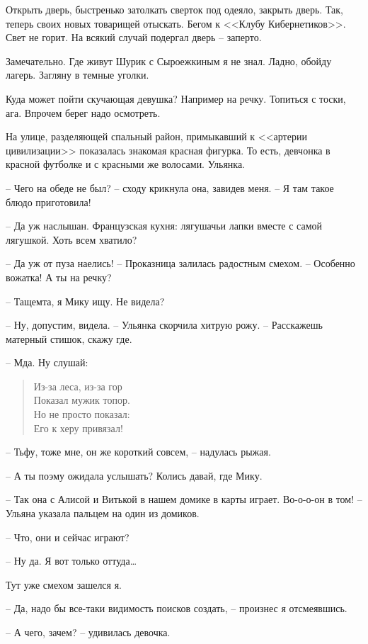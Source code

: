 \documentclass[a4paper]{book}
\begin{document}
Открыть дверь, быстренько затолкать сверток под одеяло, закрыть дверь. Так, теперь своих новых товарищей отыскать. Бегом к <<Клубу Кибернетиков>>. Свет не горит. На всякий случай подергал дверь -- заперто. 

Замечательно. Где живут Шурик с Сыроежкиным я не знал. Ладно, обойду лагерь. Загляну в темные уголки. 

Куда может пойти скучающая девушка? Например на речку. Топиться с тоски, ага. Впрочем берег надо осмотреть.

На улице, разделяющей спальный район, примыкавший к <<артерии цивилизации>> показалась знакомая красная фигурка. То есть, девчонка в красной футболке и с красными же волосами. Ульянка.

-- Чего на обеде не был? -- сходу крикнула она, завидев меня. -- Я там такое блюдо приготовила!

-- Да уж наслышан. Французская кухня: лягушачьи лапки вместе с самой лягушкой. Хоть всем хватило?

-- Да уж от пуза наелись! -- Проказница залилась радостным смехом. -- Особенно вожатка! А ты на речку?

-- Тащемта, я Мику ищу. Не видела?

-- Ну, допустим, видела. -- Ульянка скорчила хитрую рожу. -- Расскажешь матерный стишок, скажу где.

-- Мда. Ну слушай:
\begin{verse}
	Из-за леса, из-за гор\\
	Показал мужик топор.\\
	Но не просто показал:\\
	Его к херу привязал!\\ 
\end{verse}

-- Тьфу, тоже мне, он же короткий совсем, -- надулась рыжая.

-- А ты поэму ожидала услышать? Колись давай, где Мику.

-- Так она с Алисой и Витькой в нашем домике в карты играет. Во-о-о-он в том! -- Ульяна указала пальцем на один из домиков. 

-- Что, они и сейчас играют?

-- Ну да. Я вот только оттуда\ldots

Тут уже смехом зашелся я.

-- Да, надо бы все-таки видимость поисков создать, -- произнес я отсмеявшись.

-- А чего, зачем? -- удивилась девочка.
\end{document}
